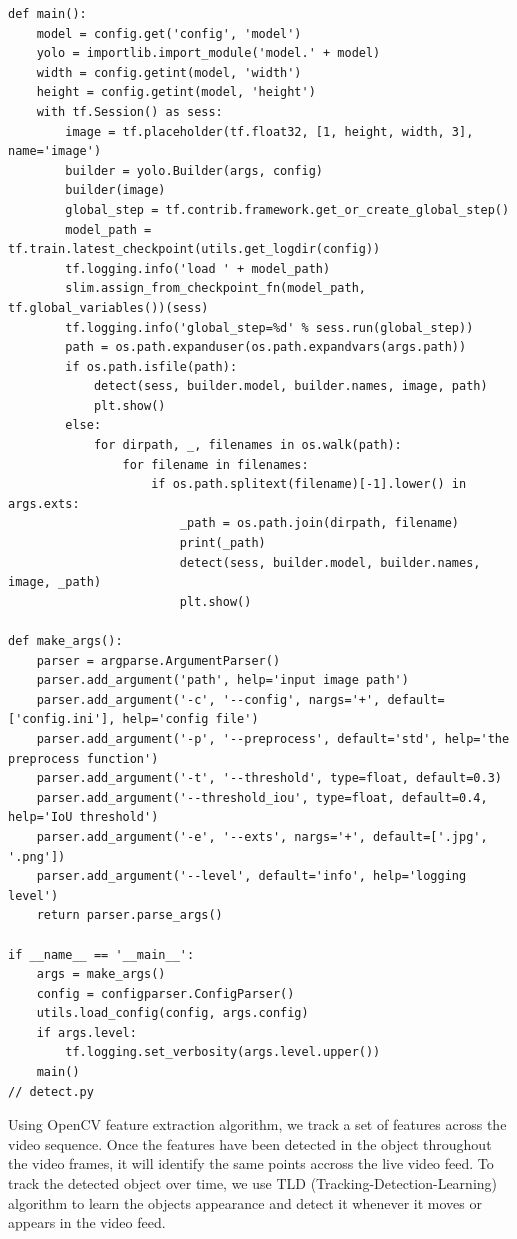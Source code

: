 \begin{lstlisting}
def main():
    model = config.get('config', 'model')
    yolo = importlib.import_module('model.' + model)
    width = config.getint(model, 'width')
    height = config.getint(model, 'height')
    with tf.Session() as sess:
        image = tf.placeholder(tf.float32, [1, height, width, 3], name='image')
        builder = yolo.Builder(args, config)
        builder(image)
        global_step = tf.contrib.framework.get_or_create_global_step()
        model_path = tf.train.latest_checkpoint(utils.get_logdir(config))
        tf.logging.info('load ' + model_path)
        slim.assign_from_checkpoint_fn(model_path, tf.global_variables())(sess)
        tf.logging.info('global_step=%d' % sess.run(global_step))
        path = os.path.expanduser(os.path.expandvars(args.path))
        if os.path.isfile(path):
            detect(sess, builder.model, builder.names, image, path)
            plt.show()
        else:
            for dirpath, _, filenames in os.walk(path):
                for filename in filenames:
                    if os.path.splitext(filename)[-1].lower() in args.exts:
                        _path = os.path.join(dirpath, filename)
                        print(_path)
                        detect(sess, builder.model, builder.names, image, _path)
                        plt.show()

def make_args():
    parser = argparse.ArgumentParser()
    parser.add_argument('path', help='input image path')
    parser.add_argument('-c', '--config', nargs='+', default=['config.ini'], help='config file')
    parser.add_argument('-p', '--preprocess', default='std', help='the preprocess function')
    parser.add_argument('-t', '--threshold', type=float, default=0.3)
    parser.add_argument('--threshold_iou', type=float, default=0.4, help='IoU threshold')
    parser.add_argument('-e', '--exts', nargs='+', default=['.jpg', '.png'])
    parser.add_argument('--level', default='info', help='logging level')
    return parser.parse_args()

if __name__ == '__main__':
    args = make_args()
    config = configparser.ConfigParser()
    utils.load_config(config, args.config)
    if args.level:
        tf.logging.set_verbosity(args.level.upper())
    main()
// detect.py
\end{lstlisting}

\vspace{5mm}
Using OpenCV feature extraction algorithm, we track a set of features across the video sequence. Once the features have been detected in the object throughout the video frames, it will identify the same points accross the live video feed. To track the detected object over time,  we use TLD (Tracking-Detection-Learning) algorithm to learn the objects appearance and detect it whenever it moves or appears in the video feed.

